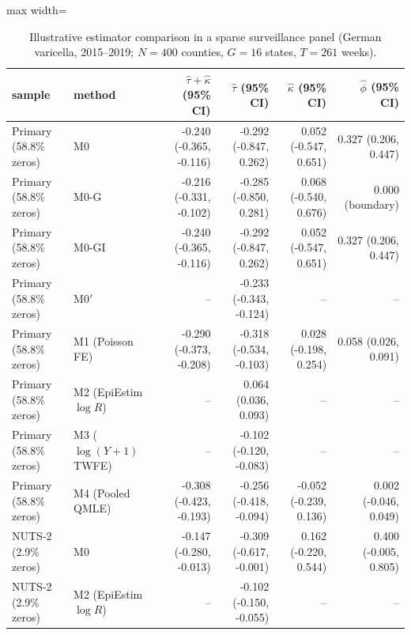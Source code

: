 \begin{table}[!t]
\centering
\caption{Illustrative estimator comparison in a sparse surveillance panel (German varicella, 2015--2019; $N=400$ counties, $G=16$ states, $T=261$ weeks).}
\label{tab:app}
\footnotesize
\setlength{\tabcolsep}{3.5pt}
\begin{adjustbox}{max width=\linewidth}
\begin{tabular}{llrrrr}
\toprule
sample & method & $\hat\tau+\hat\kappa$ (95\% CI) & $\hat\tau$ (95\% CI) & $\hat\kappa$ (95\% CI) & $\hat\phi$ (95\% CI) \\
\midrule
Primary (58.8\% zeros) & M0 & -0.240 (-0.365, -0.116) & -0.292 (-0.847, 0.262) & 0.052 (-0.547, 0.651) & 0.327 (0.206, 0.447) \\
Primary (58.8\% zeros) & M0-G & -0.216 (-0.331, -0.102) & -0.285 (-0.850, 0.281) & 0.068 (-0.540, 0.676) & 0.000 (boundary) \\
Primary (58.8\% zeros) & M0-GI & -0.240 (-0.365, -0.116) & -0.292 (-0.847, 0.262) & 0.052 (-0.547, 0.651) & 0.327 (0.206, 0.447) \\
Primary (58.8\% zeros) & M0$'$ & -- & -0.233 (-0.343, -0.124) & -- & -- \\
Primary (58.8\% zeros) & M1 (Poisson FE) & -0.290 (-0.373, -0.208) & -0.318 (-0.534, -0.103) & 0.028 (-0.198, 0.254) & 0.058 (0.026, 0.091) \\
Primary (58.8\% zeros) & M2 (EpiEstim $\log R$) & -- & 0.064 (0.036, 0.093) & -- & -- \\
Primary (58.8\% zeros) & M3 ($\log(Y+1)$ TWFE) & -- & -0.102 (-0.120, -0.083) & -- & -- \\
Primary (58.8\% zeros) & M4 (Pooled QMLE) & -0.308 (-0.423, -0.193) & -0.256 (-0.418, -0.094) & -0.052 (-0.239, 0.136) & 0.002 (-0.046, 0.049) \\
NUTS-2 (2.9\% zeros) & M0 & -0.147 (-0.280, -0.013) & -0.309 (-0.617, -0.001) & 0.162 (-0.220, 0.544) & 0.400 (-0.005, 0.805) \\
NUTS-2 (2.9\% zeros) & M2 (EpiEstim $\log R$) & -- & -0.102 (-0.150, -0.055) & -- & -- \\
\bottomrule
\end{tabular}
\end{adjustbox}

\end{table}

